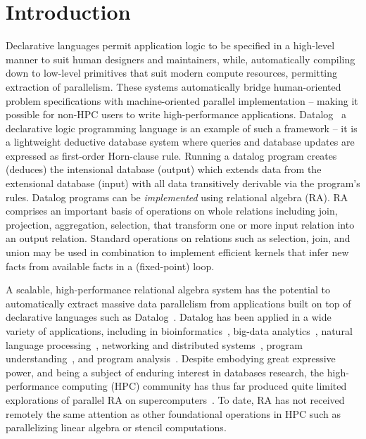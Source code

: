 \section{Introduction}

Declarative languages permit application logic to be specified in a high-level manner to suit human designers and maintainers, while, automatically compiling down to low-level primitives that suit modern compute resources, permitting extraction of parallelism. These systems automatically bridge human-oriented problem specifications with machine-oriented parallel implementation -- making it possible for non-HPC users to write high-performance applications.
Datalog~\cite{Aref:2015, ceri1989you, de2012datalog, huang2011datalog, ullman1983principles} a declarative logic programming language is an example of such a framework -- it is a lightweight deductive database system where queries and database updates are expressed as first-order Horn-clause rule. Running a datalog program creates (deduces) the intensional database (output) which extends data from the extensional database (input) with all data transitively derivable via the program’s rules. Datalog programs can be \emph{implemented} using relational algebra (RA).
RA comprises an important basis of operations on whole relations including join, projection, aggregation, selection, that transform one or more input relation into an output relation.
Standard operations on relations such as selection, join, and union may be used in combination to implement efficient kernels that infer new facts from available facts in a (fixed-point) loop. 

A scalable, high-performance relational algebra system has the potential to automatically extract massive data parallelism from applications built on top of declarative languages such as Datalog~\cite{Aref:2015, ceri1989you, de2012datalog, huang2011datalog, ullman1983principles}. Datalog has been applied in a wide variety of applications, including in bioinformatics~\cite{king2004applying}, big-data analytics~\cite{halperin2014demonstration, seo2013socialite, shkapsky2016big}, natural language processing~\cite{mooney1996inductive}, networking and distributed systems~\cite{alvaro2010dedalus, conway2012logic, loo2009declarative}, program understanding~\cite{hajiyev2006codequest}, and program analysis~\cite{bravenboer2009strictly, lam2005context, smaragdakis2013set}. Despite embodying great expressive power, and being a subject of enduring interest in databases research, the high-performance computing (HPC) community has thus far produced quite limited explorations of parallel RA on supercomputers~\cite{balkesen2013multi, Cacace:1991:OPS:111828.111831, Cheiney:1990:PST:94362.94445, kim2009sort, Valduriez:1988:PET:54616.54618}. To date, RA has not received remotely the same attention as other foundational operations in HPC such as parallelizing linear algebra or stencil computations.
